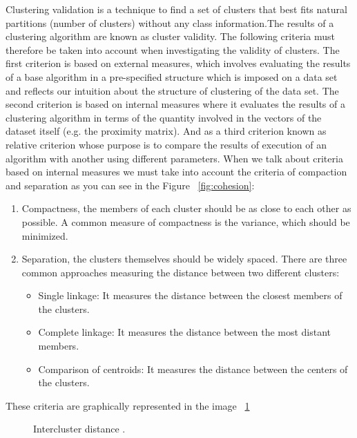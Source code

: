 Clustering validation is a technique to find a set of clusters that best fits natural partitions (number of clusters) without any class information.The results of a clustering algorithm are known as cluster validity. The following criteria must therefore be taken into account when investigating the validity of clusters. The first criterion is based on external measures, which involves evaluating the results of a base algorithm in a pre-specified structure which is imposed on a data set and reflects our intuition about the structure of clustering of the data set. The second criterion is based on internal measures where it evaluates the results of a clustering algorithm in terms of the quantity involved in the vectors of the dataset itself (e.g. the proximity matrix). And as a third criterion known as relative criterion whose purpose is to compare the results of execution of an algorithm with another using different parameters.
When we talk about criteria based on internal measures we must take into account the criteria of compaction and separation \citep{b53} \citep{b52} as you can see in the Figure ~\ref{fig:cohesion}:
\begin{enumerate}
  \item Compactness, the members of each cluster should be as close to each other as possible. A common measure of compactness is the variance, which should be minimized.
  \item Separation, the clusters themselves should be widely spaced. There are three common approaches measuring the distance between two different clusters:
  \begin{itemize}
  \item Single linkage: It measures the distance between the closest members of the clusters.
  \item Complete linkage: It measures the distance between the most distant members.
  \item Comparison of centroids: It measures the distance between the centers of the clusters.
\end{itemize}
\end{enumerate}
These criteria are graphically represented in the image ~\ref{fig:separation}

\begin{figure}[htbp]
  \centering
    \caption{Intercluster distance \citep{b60}.}%
    \label{fig:separation}%
\end{figure}

